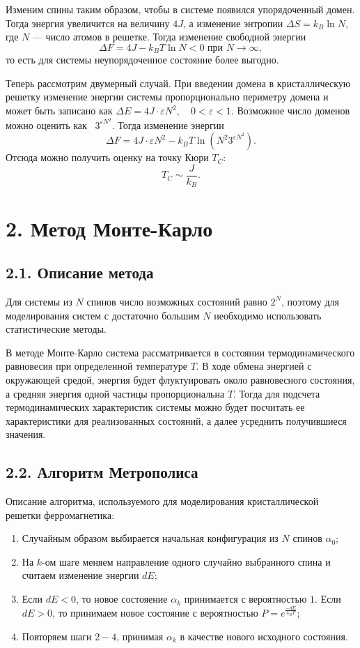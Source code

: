 \documentclass[12pt]{report}
\theoremstyle{definition}
\begin{document}
Изменим спины таким образом, чтобы в системе появился упорядоченный домен. Тогда энергия увеличится на величину $4J$, а изменение энтропии
$\Delta S = k_B \ln N$, где $N$ --- число атомов в решетке. Тогда изменение свободной энергии
\begin{equation}
    \Delta F = 4J - k_B T \ln N < 0 \text{ при }N \to \infty,
\end{equation}
то есть для системы неупорядоченное состояние более выгодно.

Теперь рассмотрим двумерный случай. При введении домена в кристаллическую решетку изменение энергии системы пропорционально периметру домена и может быть записано как
$\Delta E = 4J \cdot \varepsilon N^2, \quad 0 < \varepsilon < 1$. Возможное число доменов можно оценить как  $3^{\varepsilon N^2}$. Тогда изменение энергии
\begin{equation}
    \Delta F = 4J \cdot \varepsilon N^2 - k_B T \ln (N^2 3^{\varepsilon N^2}).
\end{equation}
Отсюда можно получить оценку на точку Кюри $T_C$:
\begin{equation}
    T_C \sim \dfrac{J}{k_B}.
\end{equation}
\chapter{2. Метод Монте-Карло}
\section{2.1. Описание метода}
Для системы из $N$ спинов число возможных состояний равно $2^N$, поэтому
для моделирования систем с достаточно большим $N$ необходимо использовать статистические методы.

В методе Монте-Карло система рассматривается в состоянии термодинамического равновесия при
определенной температуре $T$. В ходе обмена энергией с окружающей средой, энергия будет
флуктуировать около равновесного состояния, а средняя энергия одной частицы пропорциональна $T$.
Тогда для подсчета термодинамических характеристик системы можно будет посчитать ее характеристики для реализованных состояний,
а далее усреднить получившиеся значения.
\section{2.2. Алгоритм Метрополиса}
Описание алгоритма, используемого для моделирования кристаллической решетки ферромагнетика:
\begin{enumerate}
    \item Случайным образом выбирается начальная конфигурация из $N$ спинов $\alpha_0$;
    \item На $k$-ом шаге меняем направление одного случайно выбранного спина и считаем изменение энергии $dE$;
    \item Если $dE < 0$, то новое состояение $\alpha_k$ принимается с вероятностью $1$. 
    Если $dE > 0$, то принимаем новое состояние с вероятностью $P = e^{\frac{-dE}{k_B T}}$;
    \item Повторяем шаги $2-4$, принимая $\alpha_k$ в качестве нового исходного состояния.
\end{enumerate}
\end{document}
